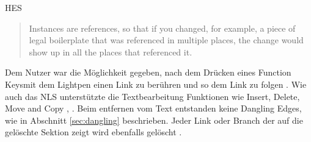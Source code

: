 \begin{section}{HES}
\begin{quote}
\glqq Instances are references, so that if you changed, for example, a piece of legal boilerplate that was referenced in multiple places, the change would show up in all the places that referenced it. \grqq{ }\cite{Dam1988}
\end{quote}

Dem Nutzer war die Möglichkeit gegeben, nach dem Drücken eines \glqq Function Keys\grqq{ }mit dem Lightpen einen Link zu berühren und so dem Link zu folgen \cite[S.23]{Dam1969}. Wie auch das NLS unterstützte die Textbearbeitung Funktionen wie Insert, Delete, Move and Copy \cite[S.10-14]{Dam1969}, \cite[S. 889]{Dam1988}. Beim entfernen vom Text entstanden keine Dangling Edges, wie in Abschnitt \ref{sec:dangling} beschrieben. Jeder Link oder Branch der auf die gelöschte Sektion zeigt wird ebenfalls gelöscht \cite[S.12]{Dam1969}.

\end{section}

